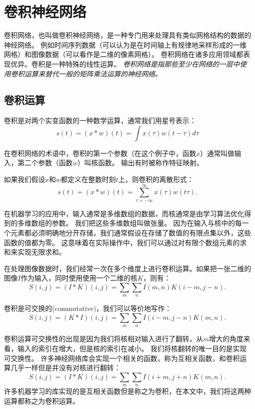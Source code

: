 \section{卷积神经网络}
卷积网络，也叫做卷积神经网络，是一种专门用来处理具有类似网格结构的数据的神经网络。
例如时间序列数据（可以认为是在时间轴上有规律地采样形成的一维网格）和图像数据（可以看作是二维的像素网格）。
卷积网络在诸多应用领域都表现优异。卷积是一种特殊的线性运算。
\emph{卷积网络是指那些至少在网络的一层中使用卷积运算来替代一般的矩阵乘法运算的神经网络。}\par

\subsection{卷积运算}
\label{sec:the_convolution_operation}

卷积是对两个实变函数的一种数学运算，通常我们用星号表示：
\begin{equation}
s(t) = (x*w)(t) = \int x(\tau)w(t-\tau)d\tau
\end{equation}

在卷积网络的术语中，卷积的第一个参数（在这个例子中，函数$x$）通常叫做输入，第二个参数（函数$w$）叫核函数。
输出有时被称作特征映射。

如果我们假设$x$和$w$都定义在整数时刻$t$上，则卷积的离散形式：
\begin{equation}
s(t) = (x*w)(t) = \sum_{\tau = -\infty}^{\infty} x(\tau)w(t\tau).
\end{equation}

在机器学习的应用中，输入通常是多维数组的数据，而核通常是由学习算法优化得到的多维数组的参数。
我们把这些多维数组叫做张量。
因为在输入与核中的每一个元素都必须明确地分开存储，我们通常假设在存储了数值的有限点集以外，这些函数的值都为零。
这意味着在实际操作中，我们可以通过对有限个数组元素的求和来实现无限求和。

在处理图像数据时，我们经常一次在多个维度上进行卷积运算。如果把一张二维的图像$I$作为输入，同时使用使用一个二维的核$K$，则有：
\begin{equation}
S(i,j) = (I*K)(i,j) = \sum_m \sum_n I(m,n) K(i-m, j-n).
\end{equation}

卷积是可交换的(commutative)，我们可以等价地写作：
\begin{equation}
S(i, j) = (K*I)(i,j) = \sum_m \sum_n I(i-m, j-n) K(m, n).
\end{equation}

卷积运算可交换性的出现是因为我们将核相对输入进行了翻转，从$m$增大的角度来看，输入的索引在增大，但是核的索引在减小。
我们将核翻转的唯一目的是实现可交换性。
许多神经网络库会实现一个相关的函数，称为互相关函数，和卷积运算几乎一样但是并没有对核进行翻转：
\begin{equation}
S(i, j) = (I*K)(i, j) = \sum_m \sum_n I(i+m, j+n) K(m, n).
\end{equation}
许多机器学习的库实现的是互相关函数但是称之为卷积，在本文中，我们将这两种运算都称之为卷积运算。\par

